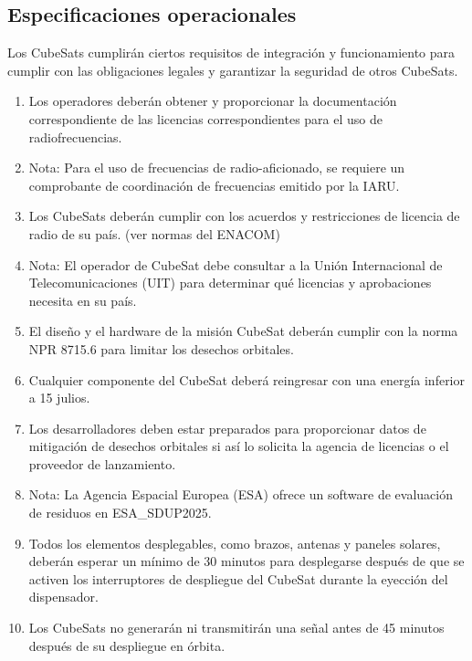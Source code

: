 \documentclass[11pt,a4paper,twoside]{report}
\begin{document}
	
	
	\subsection{Especificaciones operacionales}
	Los CubeSats cumplirán ciertos requisitos de integración y funcionamiento para cumplir con las obligaciones legales y garantizar la seguridad de otros CubeSats.
	\begin{enumerate}
		\item Los operadores deberán obtener y proporcionar la documentación correspondiente de las licencias correspondientes para el uso de radiofrecuencias.
		
		\item Nota: Para el uso de frecuencias de radio-aficionado, se requiere un comprobante de coordinación de frecuencias emitido por la IARU.
		
		\item Los CubeSats deberán cumplir con los acuerdos y restricciones de licencia de radio de su país. (ver normas del ENACOM)
		
		\item Nota: El operador de CubeSat debe consultar a la Unión Internacional de Telecomunicaciones (UIT) para determinar qué licencias y aprobaciones necesita en su país.
		
		\item El diseño y el hardware de la misión CubeSat deberán cumplir con la norma NPR 8715.6  para limitar los desechos orbitales.
		
		\item Cualquier componente del CubeSat deberá reingresar con una energía inferior a 15 julios.
		
		\item Los desarrolladores deben estar preparados para proporcionar datos de mitigación de desechos orbitales si así lo solicita la agencia de licencias o el proveedor de lanzamiento.
		
		\item Nota: La Agencia Espacial Europea (ESA) ofrece un software de evaluación de residuos en ESA\_SDUP2025.
		
		\item Todos los elementos desplegables, como brazos, antenas y paneles solares, deberán esperar un mínimo de 30 minutos para desplegarse después de que se activen los interruptores de despliegue del CubeSat durante la eyección del dispensador.
		
		\item Los CubeSats no generarán ni transmitirán una señal antes de 45 minutos después de su despliegue en órbita.
		

\end{enumerate}
\end{document}
